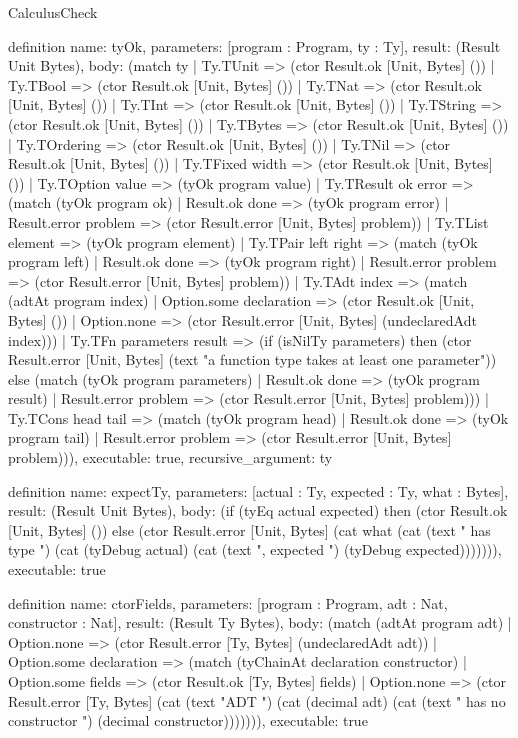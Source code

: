 \begin{lexlean}{CalculusCheck}
\begin{semanticmodule}
definition{
  name: tyOk,
  parameters: [program : Program, ty : Ty],
  result: (Result Unit Bytes),
  body: (match ty
    | Ty.TUnit => (ctor Result.ok [Unit, Bytes] ())
    | Ty.TBool => (ctor Result.ok [Unit, Bytes] ())
    | Ty.TNat => (ctor Result.ok [Unit, Bytes] ())
    | Ty.TInt => (ctor Result.ok [Unit, Bytes] ())
    | Ty.TString => (ctor Result.ok [Unit, Bytes] ())
    | Ty.TBytes => (ctor Result.ok [Unit, Bytes] ())
    | Ty.TOrdering => (ctor Result.ok [Unit, Bytes] ())
    | Ty.TNil => (ctor Result.ok [Unit, Bytes] ())
    | Ty.TFixed width => (ctor Result.ok [Unit, Bytes] ())
    | Ty.TOption value => (tyOk program value)
    | Ty.TResult ok error => (match (tyOk program ok)
      | Result.ok done => (tyOk program error)
      | Result.error problem => (ctor Result.error [Unit, Bytes] problem))
    | Ty.TList element => (tyOk program element)
    | Ty.TPair left right => (match (tyOk program left)
      | Result.ok done => (tyOk program right)
      | Result.error problem => (ctor Result.error [Unit, Bytes] problem))
    | Ty.TAdt index => (match (adtAt program index)
      | Option.some declaration => (ctor Result.ok [Unit, Bytes] ())
      | Option.none => (ctor Result.error [Unit, Bytes] (undeclaredAdt index)))
    | Ty.TFn parameters result => (if (isNilTy parameters) then (ctor Result.error [Unit, Bytes] (text "a function type takes at least one parameter")) else (match (tyOk program parameters)
      | Result.ok done => (tyOk program result)
      | Result.error problem => (ctor Result.error [Unit, Bytes] problem)))
    | Ty.TCons head tail => (match (tyOk program head)
      | Result.ok done => (tyOk program tail)
      | Result.error problem => (ctor Result.error [Unit, Bytes] problem))),
  executable: true,
  recursive_argument: ty
}

definition{
  name: expectTy,
  parameters: [actual : Ty, expected : Ty, what : Bytes],
  result: (Result Unit Bytes),
  body: (if (tyEq actual expected) then (ctor Result.ok [Unit, Bytes] ()) else (ctor Result.error [Unit, Bytes] (cat what (cat (text " has type ") (cat (tyDebug actual) (cat (text ", expected ") (tyDebug expected))))))),
  executable: true
}

definition{
  name: ctorFields,
  parameters: [program : Program, adt : Nat, constructor : Nat],
  result: (Result Ty Bytes),
  body: (match (adtAt program adt)
    | Option.none => (ctor Result.error [Ty, Bytes] (undeclaredAdt adt))
    | Option.some declaration => (match (tyChainAt declaration constructor)
      | Option.some fields => (ctor Result.ok [Ty, Bytes] fields)
      | Option.none => (ctor Result.error [Ty, Bytes] (cat (text "ADT ") (cat (decimal adt) (cat (text " has no constructor ") (decimal constructor))))))),
  executable: true
}


\end{semanticmodule}
\end{lexlean}
